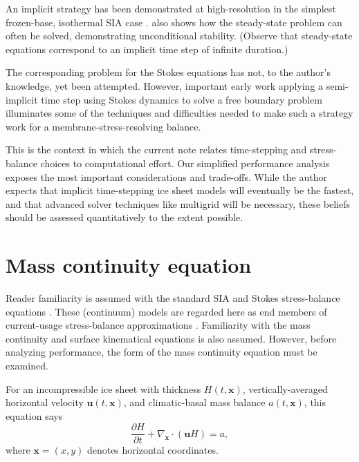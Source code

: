 \documentclass[twocolumn,letterpaper]{igs}
\newcommand\bu{\mathbf{u}}
\newcommand\bx{\mathbf{x}}
\newcommand{\Divx}{\nabla_\bx \cdot}
\begin{document}
An implicit strategy has been demonstrated at high-resolution in the simplest frozen-base, isothermal SIA case \citep{Bueler2016,JouvetGraeser2013}.  \cite{Bueler2016} also shows how the steady-state problem \citep{JouvetBueler2012} can often be solved, demonstrating unconditional stability.  (Observe that steady-state equations correspond to an implicit time step of infinite duration.)

The corresponding problem for the Stokes equations has not, to the author's knowledge, yet been attempted.  However, important early work applying a semi-implicit time step using Stokes dynamics \citep{WirbelJarosch2020} to solve a free boundary problem illuminates some of the techniques and difficulties needed to make such a strategy work for a membrane-stress-resolving balance.

This is the context in which the current note relates time-stepping and stress-balance choices to computational effort.  Our simplified performance analysis exposes the most important considerations and trade-offs.  While the author expects that implicit time-stepping ice sheet models will eventually be the fastest, and that advanced solver techniques like multigrid \citep{Briggsetal2000} will be necessary, these beliefs should be assessed quantitatively to the extent possible.


\section{Mass continuity equation}

Reader familiarity is assumed with the standard SIA and Stokes stress-balance equations \citep{GreveBlatter2009,SchoofHewitt2013}.  These (continuum) models are regarded here as end members of current-usage stress-balance approximations \citep{Robinsonetal2022}.  Familiarity with the mass continuity and surface kinematical equations \citep{GreveBlatter2009} is also assumed.  However, before analyzing performance, the form of the mass continuity equation must be examined.

For an incompressible ice sheet with thickness $H(t,\bx)$, vertically-averaged horizontal velocity $\bu(t,\bx)$, and climatic-basal mass balance $a(t,\bx)$, this equation says
\begin{equation}
\frac{\partial H}{\partial t} + \Divx \left(\bu H\right) = a, \label{eq:masscontinuity}
\end{equation}
where $\bx=(x,y)$ denotes horizontal coordinates.
\end{document}
